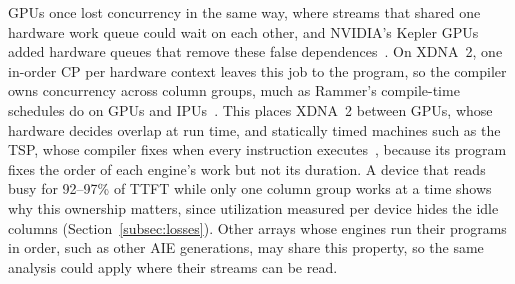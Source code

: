 \documentclass{article}
\begin{document}
GPUs once lost concurrency in the same way, where streams that shared one hardware work queue could wait on each other, and NVIDIA's Kepler GPUs added hardware queues that remove these false dependences~\citep{nvidia-kepler-tuning}.
On XDNA~2, one in-order CP per hardware context leaves this job to the program, so the compiler owns concurrency across column groups, much as Rammer's compile-time schedules do on GPUs and IPUs~\citep{ma2020rammer}.
This places XDNA~2 between GPUs, whose hardware decides overlap at run time, and statically timed machines such as the TSP, whose compiler fixes when every instruction executes~\citep{abts2020tsp}, because its program fixes the order of each engine's work but not its duration.
A device that reads busy for 92--97\% of TTFT while only one column group works at a time shows why this ownership matters, since utilization measured per device hides the idle columns (Section~\ref{subsec:losses}).
Other arrays whose engines run their programs in order, such as other AIE generations, may share this property, so the same analysis could apply where their streams can be read.
\end{document}
